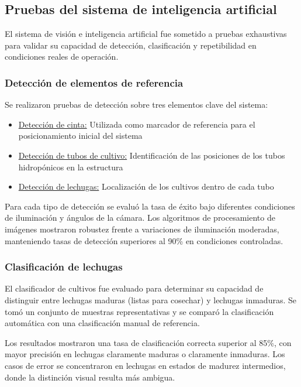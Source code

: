 \subsection{Pruebas del sistema de inteligencia artificial}

El sistema de visión e inteligencia artificial fue sometido a pruebas exhaustivas para validar su capacidad de detección, clasificación y repetibilidad en condiciones reales de operación.

\subsubsection{Detección de elementos de referencia}

Se realizaron pruebas de detección sobre tres elementos clave del sistema:

\begin{itemize}[label=$\bullet$]
    \item \underline{Detección de cinta:} Utilizada como marcador de referencia para el posicionamiento inicial del sistema
    \item \underline{Detección de tubos de cultivo:} Identificación de las posiciones de los tubos hidropónicos en la estructura
    \item \underline{Detección de lechugas:} Localización de los cultivos dentro de cada tubo
\end{itemize}

Para cada tipo de detección se evaluó la tasa de éxito bajo diferentes condiciones de iluminación y ángulos de la cámara. Los algoritmos de procesamiento de imágenes mostraron robustez frente a variaciones de iluminación moderadas, manteniendo tasas de detección superiores al 90\% en condiciones controladas.

\subsubsection{Clasificación de lechugas}

El clasificador de cultivos fue evaluado para determinar su capacidad de distinguir entre lechugas maduras (listas para cosechar) y lechugas inmaduras. Se tomó un conjunto de muestras representativas y se comparó la clasificación automática con una clasificación manual de referencia.

Los resultados mostraron una tasa de clasificación correcta superior al 85\%, con mayor precisión en lechugas claramente maduras o claramente inmaduras. Los casos de error se concentraron en lechugas en estados de madurez intermedios, donde la distinción visual resulta más ambigua.

